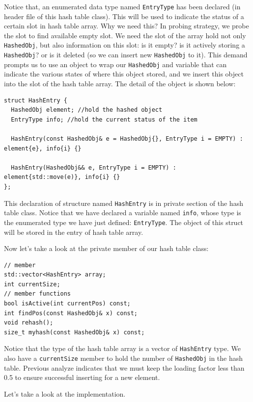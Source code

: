 \documentclass[12pt]{book}
\begin{document}
Notice that, an enumerated data type named \texttt{EntryType} has been declared (in header file of this hash table class). This will be used to indicate the status of a certain slot in hash table array. Why we need this? In probing strategy, we probe the slot to find available empty slot. We need the slot of the array hold not only \texttt{HashedObj}, but also information on this slot: is it empty? is it actively storing a \texttt{HashedObj}? or is it deleted (so we can insert new \texttt{HashedObj} to it). This demand prompts us to use an object to wrap our \texttt{HashedObj} and variable that can indicate the various states of where this object stored, and we insert this object into the slot of the hash table array. The detail of the object is shown below:
\begin{verbatim}
struct HashEntry {
  HashedObj element; //hold the hashed object
  EntryType info; //hold the current status of the item

  HashEntry(const HashedObj& e = HashedObj{}, EntryType i = EMPTY) : element{e}, info{i} {}

  HashEntry(HashedObj&& e, EntryType i = EMPTY) : element{std::move(e)}, info{i} {}
};
\end{verbatim}
This declaration of structure named \texttt{HashEntry} is in private section of the hash table class. Notice that we have declared a variable named \texttt{info}, whose type is the enumerated type we have just defined: \texttt{EntryType}. The object of this struct will be stored in the entry of hash table array.

Now let's take a look at the private member of our hash table class:
\begin{verbatim}
// member 
std::vector<HashEntry> array;
int currentSize;
// member functions
bool isActive(int currentPos) const;
int findPos(const HashedObj& x) const;
void rehash();
size_t myhash(const HashedObj& x) const;
\end{verbatim}

Notice that the type of the hash table array is a vector of \texttt{HashEntry} type. We also have a \texttt{currentSize} member to hold the number of \texttt{HashedObj} in the hash table. Previous analyze indicates that we must keep the loading factor less than 0.5 to ensure successful inserting for a new element.

Let's take a look at the implementation.
\end{document}
